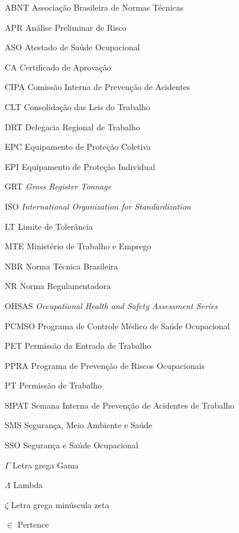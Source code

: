 \begin{siglas}
  \item[ABNT] Associação Brasileira de Normas Técnicas
  \item[APR] Análise Preliminar de Risco
  \item[ASO] Atestado de Saúde Ocupacional
  \item[CA] Certificado de Aprovação
  \item[CIPA] Comissão Interna de Prevenção de Acidentes
  \item[CLT] Consolidação das Leis do Trabalho
  \item[DRT] Delegacia Regional de Trabalho
  \item[EPC] Equipamento de Proteção Coletiva
  \item[EPI] Equipamento de Proteção Individual
  \item[GRT] \emph{Gross Register Tonnage}
  \item[ISO] \emph{International Organization for Standardization}
  \item[LT] Limite de Tolerância
  \item[MTE] Ministério de Trabalho e Emprego
  \item[NBR] Norma Técnica Brasileira
  \item[NR] Norma Regulamentadora
  \item[OHSAS] \emph{Occupational Health and Safety Assessment Series}
  \item[PCMSO] Programa de Controle Médico de Saúde Ocupacional
  \item[PET] Permissão da Entrada de Trabalho
  \item[PPRA] Programa de Prevenção de Riscos Ocupacionais
  \item[PT] Permissão de Trabalho
  \item[SIPAT] Semana Interna de Prevenção de Acidentes de Trabalho
  \item[SMS] Segurança, Meio Ambiente e Saúde
  \item[SSO] Segurança e Saúde Ocupacional
\end{siglas}

\begin{simbolos}
  \item[$ \Gamma $] Letra grega Gama
  \item[$ \Lambda $] Lambda
  \item[$ \zeta $] Letra grega minúscula zeta
  \item[$ \in $] Pertence
\end{simbolos}
